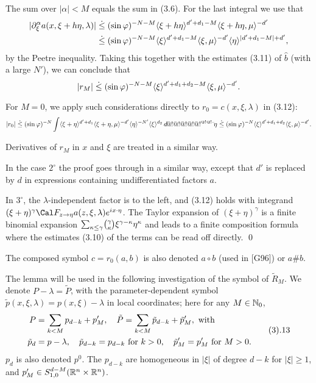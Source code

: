 The sum over $|\alpha |<M$ equals the sum in (3.6). For the
last integral we use that
$$
\aligned
|\partial_\xi ^\alpha a(x,\xi +h\eta ,\lambda )|&\leg (\sin\varphi
)^{-N-M}\ang{\xi +h\eta }^{d'+d_1-M}\ang{\xi +h\eta ,\mu }^{-d'}\\ &\leg
(\sin\varphi
)^{-N-M}\ang{\xi }^{d'+d_1-M}\ang{\xi ,\mu }^{-d'}\ang\eta ^{|d'+d_1-M|+d'},
\endaligned
$$
by the Peetre inequality. Taking this together with the estimates
(3.11) of $\hat b$ (with a large $N'$), we can conclude
that
$$
|r_M|\;\dot{\le}\;
(\sin\varphi
)^{-N-M}\langle {\xi } \rangle^{d'+d_1+d_2-M}\langle {\xi ,\mu } \rangle^{-d'}.
$$

For $M=0$, we apply such considerations directly to $r_0=c(x,\xi ,\lambda
)$ in (3.12):
$$
|r_0|\;\dot{\le}\; (\sin\varphi )^{-N}\int \langle {\xi +\eta } \rangle^{d'+d_1}\langle {\xi
+\eta ,\mu } \rangle^{-d'}\langle {\eta} \rangle ^{-N'}\langle {\xi} \rangle ^{d_2}\,d\!@!@!@!@!@!{}^{@!@!\text{\rm--}}\!\eta \;\dot{\le}\;
(\sin\varphi )^{-N} \langle {\xi  } \rangle^{d'+d_1+d_2}\langle {\xi
 ,\mu } \rangle^{-d'}.
$$

Derivatives of $r_M$ in $x$ and $\xi $ are treated in a similar way.

In the case $2^\circ$ the proof goes through in a similar way, except
that $d'$ is replaced by $d$ in expressions containing
undifferentiated factors $a$.

In $3^\circ$,  the $\lambda $-independent factor is to the left, and
(3.12) holds with integrand \linebreak$(\xi +\eta )^\gamma \Cal F_{z\to\eta }a(z,\xi
,\lambda )e^{ix\cdot\eta }$. The Taylor expansion of $(\xi +\eta )^\gamma $ is
a finite binomial expansion ${\sum}_{\kappa \le \gamma }\tbinom
\gamma  \kappa \xi ^{\gamma -\kappa }\eta ^\kappa $ and leads to  a finite
composition formula where the estimates (3.10) of the terms can be read off directly.
\qed


\enddemo

The composed symbol $c=r_0(a,b)$ is also denoted $a\circ b$ (used in
[G96]) or $a\# b$.


The lemma will be used in the following investigation of the symbol
of $\widetilde R_M$. We denote $P-\lambda =\widetilde P$, with the
parameter-dependent symbol $\tilde p(x,\xi ,\lambda )=p(x,\xi
)-\lambda $ in local coordinates; here for any $M\in {\Bbb N}_0$,
$$
\aligned
P&=\sum_{k<M}p_{d-k}+p'_M,\quad \tilde P=\sum_{k<M}\tilde
p_{d-k}+\tilde p'_M,\text{ with}\\
\tilde p_d&=p-\lambda ,\quad \tilde p_{d-k}=p_{d-k}\text{ for
}k>0,\quad \tilde p'_M=p'_M\text{ for }M>0.
\endaligned\tag3.13
$$
$p_d$ is also denoted $p^0$.
The $p_{d-k}$ are homogeneous in $|\xi |$ of degree $d-k$ for $|\xi
|\ge 1$, and $p'_M\in S^{d-M}_{1,0}({\Bbb R}^n\times{\Bbb R}^n)$.


